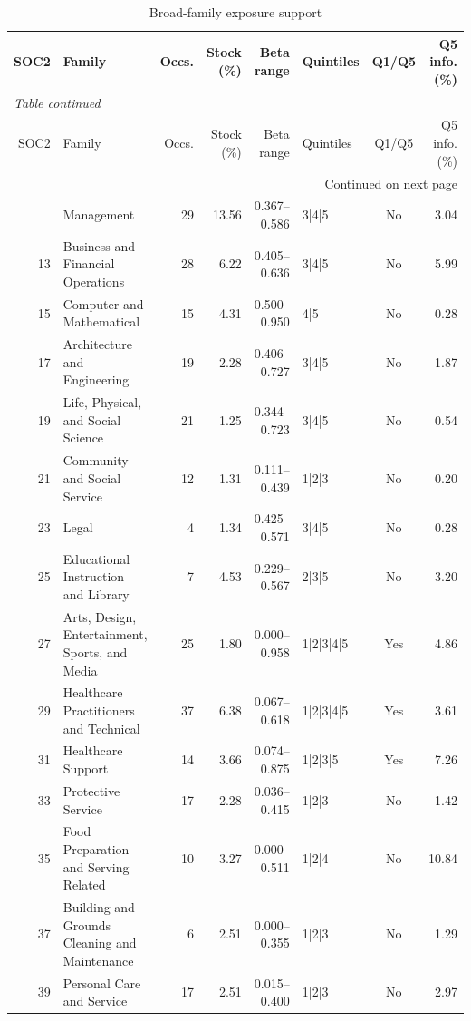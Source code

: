 \begin{center}
\footnotesize
\begin{longtable}{@{}r p{} r r r l c r@{}}
\caption{Broad-family exposure support}\label{tab:app_family_support}\\
\toprule
SOC2 & Family & Occs. & Stock (\%) & Beta range & Quintiles & Q1/Q5 & Q5 info. (\%) \\
\midrule
\endfirsthead
\multicolumn{8}{l}{\footnotesize\itshape Table \thetable{} continued}\\
\toprule
SOC2 & Family & Occs. & Stock (\%) & Beta range & Quintiles & Q1/Q5 & Q5 info. (\%) \\
\midrule
\endhead
\midrule\multicolumn{8}{r}{\footnotesize Continued on next page}\\
\endfoot
\bottomrule
\endlastfoot
11 & Management & 29 & 13.56 & 0.367--0.586 & 3|4|5 & No & 3.04 \\
13 & Business and Financial Operations & 28 & 6.22 & 0.405--0.636 & 3|4|5 & No & 5.99 \\
15 & Computer and Mathematical & 15 & 4.31 & 0.500--0.950 & 4|5 & No & 0.28 \\
17 & Architecture and Engineering & 19 & 2.28 & 0.406--0.727 & 3|4|5 & No & 1.87 \\
19 & Life, Physical, and Social Science & 21 & 1.25 & 0.344--0.723 & 3|4|5 & No & 0.54 \\
21 & Community and Social Service & 12 & 1.31 & 0.111--0.439 & 1|2|3 & No & 0.20 \\
23 & Legal & 4 & 1.34 & 0.425--0.571 & 3|4|5 & No & 0.28 \\
25 & Educational Instruction and Library & 7 & 4.53 & 0.229--0.567 & 2|3|5 & No & 3.20 \\
27 & Arts, Design, Entertainment, Sports, and Media & 25 & 1.80 & 0.000--0.958 & 1|2|3|4|5 & Yes & 4.86 \\
29 & Healthcare Practitioners and Technical & 37 & 6.38 & 0.067--0.618 & 1|2|3|4|5 & Yes & 3.61 \\
31 & Healthcare Support & 14 & 3.66 & 0.074--0.875 & 1|2|3|5 & Yes & 7.26 \\
33 & Protective Service & 17 & 2.28 & 0.036--0.415 & 1|2|3 & No & 1.42 \\
35 & Food Preparation and Serving Related & 10 & 3.27 & 0.000--0.511 & 1|2|4 & No & 10.84 \\
37 & Building and Grounds Cleaning and Maintenance & 6 & 2.51 & 0.000--0.355 & 1|2|3 & No & 1.29 \\
39 & Personal Care and Service & 17 & 2.51 & 0.015--0.400 & 1|2|3 & No & 2.97 \\

\end{longtable}
\end{center}
